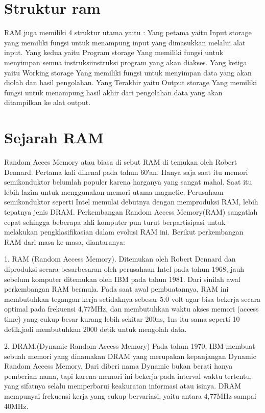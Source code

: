 \section{Struktur ram}
RAM juga memiliki 4 struktur utama yaitu :
Yang petama yaitu Input storage yang memiliki fungsi untuk menampung input yang dimasukkan melalui alat input.
Yang kedua yaitu Program storage Yang memiliki fungsi untuk menyimpan semua instruksi\-instruksi program yang akan diakses.
Yang ketiga yaitu Working storage Yang memiliki fungsi untuk menyimpan data yang akan diolah dan hasil pengolahan.
Yang Terakhir yaitu Output storage Yang memiliki fungsi untuk menampung hasil akhir dari pengolahan data yang akan ditampilkan ke alat output.

\section{Sejarah RAM}
Random Acces Memory atau biasa di sebut RAM di temukan oleh Robert Dennard.
Pertama kali dikenal pada tahun 60′an. Hanya saja saat itu memori semikonduktor belumlah populer karena harganya yang sangat mahal. Saat itu lebih lazim untuk menggunakan memori utama magnetic. Perusahaan semikonduktor seperti Intel memulai debutnya dengan memproduksi RAM, lebih tepatnya jenis DRAM. 
Perkembangan Random Access Memory(RAM) sangatlah cepat sehingga beberapa ahli komputer pun turut berpartisipasi untuk melakukan pengklasifikasian dalam evolusi RAM ini. 
Berikut perkembangan RAM dari masa ke masa, diantaranya:

1.  RAM (Random Access Memory). Ditemukan oleh Robert Dennard dan diproduksi secara besar\-besaran oleh perusahaan Intel pada tahun 1968, jauh sebelum komputer ditemukan oleh IBM pada tahun 1981. Dari sinilah awal perkembangan RAM bermula. Pada saat awal pembuatannya, RAM ini membutuhkan tegangan kerja setidaknya sebesar 5.0 volt agar bisa bekerja secara optimal pada frekuensi 4,77MHz, dan membutuhkan waktu akses memori (access time) yang cukup besar kurang lebih sekitar 200ns, 1ns itu sama seperti 10 detik,jadi membutuhkan 2000 detik untuk mengolah data.

2.  DRAM.(Dynamic Random Access Memory) Pada tahun 1970, IBM membuat sebuah memori yang dinamakan DRAM yang merupakan kepanjangan Dynamic Random Access Memory. Dari diberi nama Dynamic bukan berati hanya pemberian nama, tapi karena memori ini bekerja pada interval waktu tertentu, yang sifatnya selalu memperbarui keakuratan informasi atau isinya. DRAM mempunyai frekuensi kerja yang cukup bervariasi, yaitu antara 4,77MHz sampai 40MHz. 

